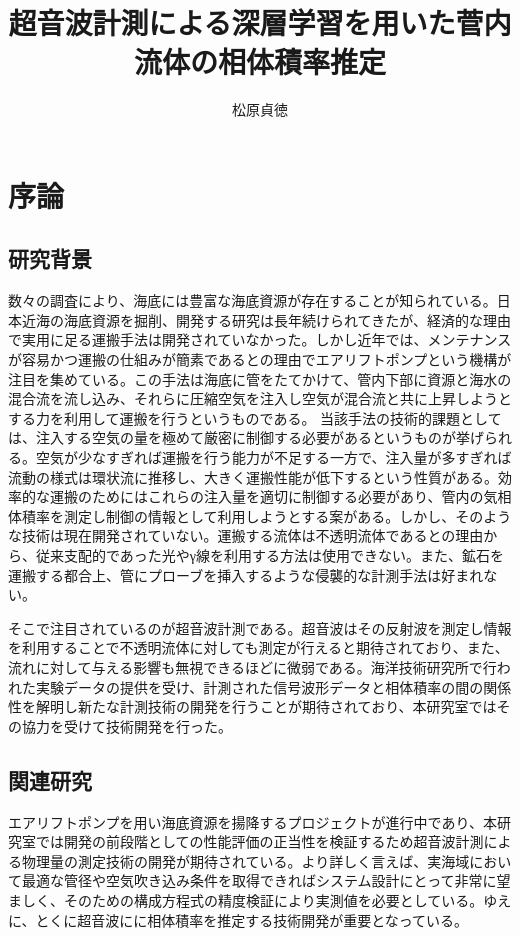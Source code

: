 \documentclass[uplatex]{suribt}
\title{超音波計測による深層学習を用いた菅内流体の相体積率推定}
\author{松原貞徳}
\makeatletter
\renewcommand{\subsection}{%
    \@startsection{subsection}{1}{\z@}%
    {0.4\Cvs}{0.1\Cvs}%
    {\normalfont\normalsize\headfont\raggedright}}
\makeatother
\begin{document}
\setcounter{tocdepth}{2}%
\maketitle
\tableofcontents
\chapter{序論}
\section{研究背景}
数々の調査により、海底には豊富な海底資源が存在することが知られている。日本近海の海底資源を掘削、開発する研究は長年続けられてきたが、経済的な理由で実用に足る運搬手法は開発されていなかった。しかし近年では、メンテナンスが容易かつ運搬の仕組みが簡素であるとの理由でエアリフトポンプという機構が注目を集めている。この手法は海底に管をたてかけて、管内下部に資源と海水の混合流を流し込み、それらに圧縮空気を注入し空気が混合流と共に上昇しようとする力を利用して運搬を行うというものである。
当該手法の技術的課題としては、注入する空気の量を極めて厳密に制御する必要があるというものが挙げられる。空気が少なすぎれば運搬を行う能力が不足する一方で、注入量が多すぎれば流動の様式は環状流に推移し、大きく運搬性能が低下するという性質がある。効率的な運搬のためにはこれらの注入量を適切に制御する必要があり、管内の気相体積率を測定し制御の情報として利用しようとする案がある。しかし、そのような技術は現在開発されていない。運搬する流体は不透明流体であるとの理由から、従来支配的であった光やγ線を利用する方法は使用できない。また、鉱石を運搬する都合上、管にプローブを挿入するような侵襲的な計測手法は好まれない。\par
そこで注目されているのが超音波計測である。超音波はその反射波を測定し情報を利用することで不透明流体に対しても測定が行えると期待されており、また、流れに対して与える影響も無視できるほどに微弱である。海洋技術研究所で行われた実験データの提供を受け、計測された信号波形データと相体積率の間の関係性を解明し新たな計測技術の開発を行うことが期待されており、本研究室ではその協力を受けて技術開発を行った。
\section{関連研究}
エアリフトポンプを用い海底資源を揚降するプロジェクトが進行中であり、本研究室では開発の前段階としての性能評価の正当性を検証するため超音波計測による物理量の測定技術の開発が期待されている。より詳しく言えば、実海域において最適な管径や空気吹き込み条件を取得できればシステム設計にとって非常に望ましく、そのための構成方程式の精度検証により実測値を必要としている。ゆえに、とくに超音波にに相体積率を推定する技術開発が重要となっている。
\end{document}

